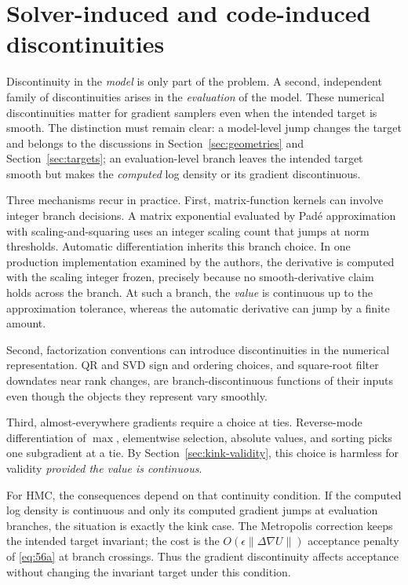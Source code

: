\documentclass[11pt]{article}
\begin{document}
\section{Solver-induced and code-induced discontinuities}
\label{sec:solver}

Discontinuity in the \emph{model} is only part of the problem. A second, independent family of discontinuities arises in the \emph{evaluation} of the model. These numerical discontinuities matter for gradient samplers even when the intended target is smooth. The distinction must remain clear: a model-level jump changes the target and belongs to the discussions in Section~\ref{sec:geometries} and Section~\ref{sec:targets}; an evaluation-level branch leaves the intended target smooth but makes the \emph{computed} log density or its gradient discontinuous.

Three mechanisms recur in practice. First, matrix-function kernels can involve integer branch decisions. A matrix exponential evaluated by Pad\'e approximation with scaling-and-squaring uses an integer scaling count that jumps at norm thresholds. Automatic differentiation inherits this branch choice. In one production implementation examined by the authors, the derivative is computed with the scaling integer frozen, precisely because no smooth-derivative claim holds across the branch. At such a branch, the \emph{value} is continuous up to the approximation tolerance, whereas the automatic derivative can jump by a finite amount.

Second, factorization conventions can introduce discontinuities in the numerical representation. QR and SVD sign and ordering choices, and square-root filter downdates near rank changes, are branch-discontinuous functions of their inputs even though the objects they represent vary smoothly.

Third, almost-everywhere gradients require a choice at ties. Reverse-mode differentiation of $\max$, elementwise selection, absolute values, and sorting picks one subgradient at a tie. By Section~\ref{sec:kink-validity}, this choice is harmless for validity \emph{provided the value is continuous}.

For HMC, the consequences depend on that continuity condition. If the computed log density is continuous and only its computed gradient jumps at evaluation branches, the situation is exactly the kink case. The Metropolis correction keeps the intended target invariant; the cost is the $O(\epsilon\|\Delta\nabla U\|)$ acceptance penalty of \eqref{eq:56a} at branch crossings. Thus the gradient discontinuity affects acceptance without changing the invariant target under this condition.
\end{document}
